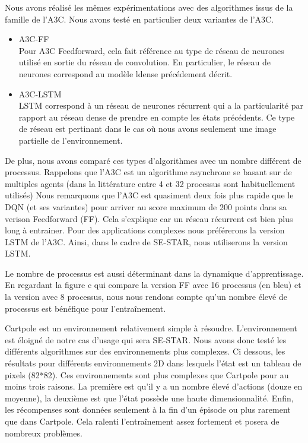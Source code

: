 Nous avons réalisé les mêmes expérimentations avec des algorithmes issus de la famille de l'A3C. Nous avons testé en particulier deux variantes de l'A3C.
\begin{itemize}
    \item A3C-FF \\
        Pour A3C Feedforward, cela fait référence au type de réseau de neurones utilisé en sortie du réseau de convolution. En particulier, le réseau de neurones correspond au modèle ldense précédement décrit.
    \item A3C-LSTM \\
        LSTM correspond à un réseau de neurones récurrent qui a la particularité par rapport au réseau dense de prendre en compte les états précédents. Ce type de réseau est pertinant dans le cas où nous avons seulement une image partielle de l'environnement.
\end{itemize}
De plus, nous avons comparé ces types d'algorithmes avec un nombre différent de processus. Rappelons que l'A3C est un algorithme asynchrone se basant sur de multiples agents (dans la littérature entre 4 et 32 processus sont habituellement utilisés) 
Nous remarquons que l'A3C est quasiment deux fois plus rapide que le DQN (et ses variantes) pour arriver au score maximum de 200 points dans sa verison Feedforward (FF). Cela s'explique car un réseau récurrent est bien plus long à entrainer. Pour des applications complexes nous préférerons la version LSTM de l'A3C. Ainsi, dans le cadre de SE-STAR, nous utiliserons la version LSTM.

Le nombre de processus est aussi déterminant dans la dynamique d'apprentissage. En regardant la figure c qui compare la version FF avec 16 processus (en bleu) et la version avec 8 processus, nous nous rendons compte qu'un nombre élevé de processus est bénéfique pour l'entraînement.

Cartpole est un environnement relativement simple à résoudre. L'environnement est éloigné de notre cas d'usage qui sera SE-STAR. Nous avons donc testé les différents algorithmes sur des environnements plus complexes. 
Ci dessous, les résultats pour différents environnements 2D dans lesquels l'état est un tableau de pixels (82*82). Ces environnements sont plus complexes que Cartpole pour au moins trois raisons. 
La première est qu'il y a un nombre élevé d'actions (douze en moyenne), la deuxième est que l'état possède une haute dimensionnalité. Enfin, les récompenses sont données seulement à la fin d'un épisode ou  plus rarement que dans Cartpole. Cela ralenti l'entraînement assez fortement et posera de nombreux problèmes.  


